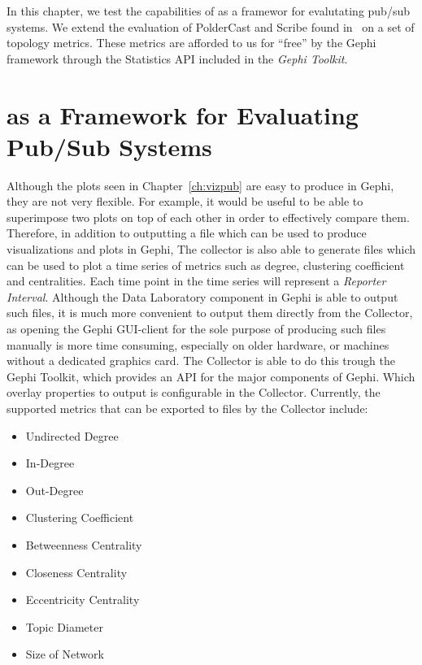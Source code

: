 In this chapter, we test the capabilities of  \demo{} as a framewor for
evalutating pub/sub systems. We extend the evaluation of PolderCast and
Scribe found in~\cite{Setty:2012} on a set of topology metrics. These
metrics are afforded to us for ``free'' by the Gephi framework through
the Statistics API included in the \emph{Gephi Toolkit}.

\section{\demo as a Framework for Evaluating Pub/Sub Systems}
\label{sec:viz_eval}

Although the plots seen in Chapter~\ref{ch:vizpub} are easy to produce
in Gephi, they are not very flexible. For example, it would be useful to
be able to superimpose two plots on top of each other in order to
effectively compare them. Therefore, in addition to outputting a \gexf
file which can be used to produce visualizations and plots in Gephi, The
collector is also able to generate \csv files which can be used to plot
a time series of metrics such as degree, clustering coefficient and
centralities. Each time point in the time series will represent a
\emph{Reporter Interval}. Although the Data Laboratory component in
Gephi is able to output such \csv files, it is much more convenient to
output them directly from the Collector, as opening the Gephi GUI-client
for the sole purpose of producing such files manually is more time
consuming, especially on older hardware, or machines without a dedicated
graphics card. The Collector is able to do this trough the Gephi
Toolkit, which provides an API for the major components of Gephi. Which
overlay properties to output is configurable in the Collector.
Currently, the supported metrics that can be exported to \csv files by
the Collector include:

\begin{itemize}
    \item Undirected Degree
    \item In-Degree
    \item Out-Degree
    \item Clustering Coefficient
    \item Betweenness Centrality
    \item Closeness Centrality
    \item Eccentricity Centrality
    \item Topic Diameter
    \item Size of Network
\end{itemize}

